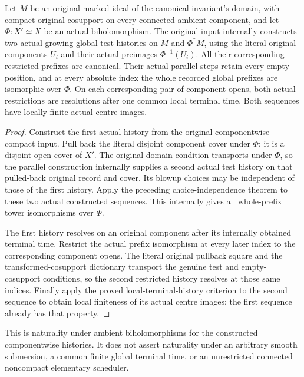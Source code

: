 \begin{theorem}
\label{hir:original-componentwise-histories-biholomorphic}
\leanok
Let $M$ be an original marked ideal of the canonical invariant's
domain, with compact original cosupport on every connected
ambient component, and let $\Phi:X'\simeq X$ be an actual
biholomorphism. The original input internally constructs two
actual growing global test histories on $M$ and $\Phi^*M$,
using the literal original components $U_i$ and their actual
preimages $\Phi^{-1}(U_i)$. All their corresponding restricted
prefixes are canonical. Their actual parallel steps retain
every empty position, and at every absolute index the whole
recorded global prefixes are isomorphic over $\Phi$.
On each corresponding pair of component opens, both actual
restrictions are resolutions after one common local terminal
time. Both sequences have locally finite actual centre images.
\end{theorem}
\begin{proof}
Construct the first actual history from the original componentwise
compact input. Pull back the literal disjoint component cover
under $\Phi$; it is a disjoint open cover of $X'$. The original
domain condition transports under $\Phi$, so the parallel
construction internally supplies a second actual test history
on that pulled-back original record and cover. Its blowup
choices may be independent of those of the first history.
Apply the preceding choice-independence theorem to these
two actual constructed sequences. This internally gives all
whole-prefix tower isomorphisms over $\Phi$.

The first history resolves on an original component after
its internally obtained terminal time. Restrict the actual
prefix isomorphism at every later index to the corresponding
component opens. The literal original pullback square and
the transformed-cosupport dictionary transport the genuine
test and empty-cosupport conditions, so the second restricted
history resolves at those same indices. Finally apply the
proved local-terminal-history criterion to the second
sequence to obtain local finiteness of its actual centre
images; the first sequence already has that property.
\end{proof}

\begin{remark}
This is naturality under ambient biholomorphisms for the constructed
componentwise histories. It does not assert naturality under an
arbitrary smooth submersion, a common finite global terminal time,
or an unrestricted connected noncompact elementary scheduler.
\end{remark}
